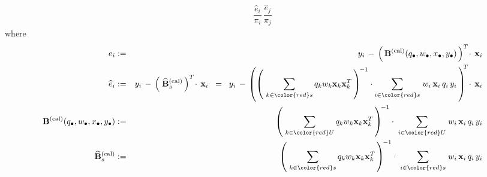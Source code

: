 \begin{lemma}
\begin{eqnarray*}
    \dfrac{\widehat{e}_{i}}{\pi_{i}}\,
    \dfrac{\widehat{e}_{j}}{\pi_{j}}
\end{eqnarray*}
where
\begin{eqnarray*}
e_{i}
& := &
    y_{i}
    \, - \,
    \left(\,\mathbf{B}^{\textnormal{(cal)}}(q_{\bullet},w_{\bullet},x_{\bullet},y_{\bullet})\,\right)^{T}
    \!\cdot\,
    \mathbf{x}_{i}
\\
\widehat{e}_{i}
& := &
    y_{i}
    \, - \,
    \left(\;\widehat{\mathbf{B}}_{s}^{\textnormal{(cal)}}\,\right)^{T}
    \!\cdot\,
    \mathbf{x}_{i}
\;\; = \;\;
    y_{i}
    \, - \,
    \left(
        \left(\;
            \underset{k \in {\color{red}s}}{\sum}\,q_{k}w_{k}\mathbf{x}_{k}\mathbf{x}_{k}^{T}
            \,\right)^{\!-1}
        \cdot
        \underset{i \in {\color{red}s}}{\sum}\;
        w_{i}\,\mathbf{x}_{i}\,q_{i}\,y_{i}
        \,\right)^{\!\!T}
    \!\cdot\,
    \mathbf{x}_{i}
\\
\mathbf{B}^{\textnormal{(cal)}}(q_{\bullet},w_{\bullet},x_{\bullet},y_{\bullet})
& := &
    \left(\;
        \underset{k \in {\color{red}U}}{\sum}\,q_{k}w_{k}\mathbf{x}_{k}\mathbf{x}_{k}^{T}
        \,\right)^{\!-1}
    \cdot\;
    \underset{i \in {\color{red}U}}{\sum}\;
    w_{i}\,\mathbf{x}_{i}\,q_{i}\,y_{i}
\\
\widehat{\mathbf{B}}_{s}^{\textnormal{(cal)}}
& := &
    \left(\;
        \underset{k \in {\color{red}s}}{\sum}\,q_{k}w_{k}\mathbf{x}_{k}\mathbf{x}_{k}^{T}
        \,\right)^{\!-1}
    \cdot\;
    \underset{i \in {\color{red}s}}{\sum}\;
    w_{i}\,\mathbf{x}_{i}\,q_{i}\,y_{i}
\end{eqnarray*}
\end{lemma}


